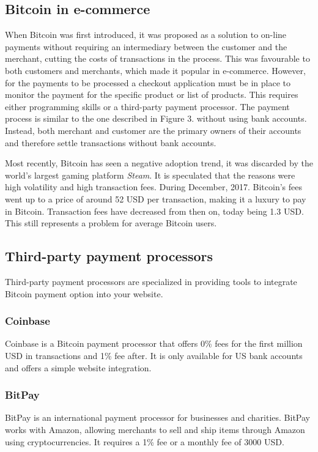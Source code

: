 \documentclass{ferseminar}
\begin{document}
\subsection{Bitcoin in e-commerce}
When Bitcoin was first introduced, it was proposed as a solution to on-line payments without requiring an intermediary between the customer and the merchant, cutting the costs of transactions in the process. This was favourable to both customers and merchants, which made it popular in e-commerce. However, for the payments to be processed a checkout application must be in place to monitor the payment for the specific product or list of products. This requires either programming skills or a third-party payment processor. The payment process is similar to the one described in Figure 3. without using bank accounts. Instead, both merchant and customer are the primary owners of their accounts and therefore settle transactions without bank accounts.

Most recently, Bitcoin has seen a negative adoption trend, it was discarded by the world's largest gaming platform \textit{Steam}. It is speculated that the reasons were high volatility and high transaction fees. During December, 2017. Bitcoin's fees went up to a price of around 52 USD per transaction, making it a luxury to pay in Bitcoin. Transaction fees have decreased from then on, today being 1.3 USD. This still represents a problem for average Bitcoin users.


\subsection{Third-party payment processors}
Third-party payment processors are specialized in providing tools to integrate Bitcoin payment option into your website. 

\subsubsection{Coinbase}
Coinbase is a Bitcoin payment processor that offers 0\% fees for the first million USD in transactions and 1\% fee after. It is only available for US bank accounts and offers a simple website integration.
\subsubsection{BitPay}
BitPay is an international payment processor for businesses and charities. BitPay works with Amazon, allowing merchants to sell and ship items through Amazon using cryptocurrencies. It requires a 1\% fee or a monthly fee of 3000 USD.
\end{document}
